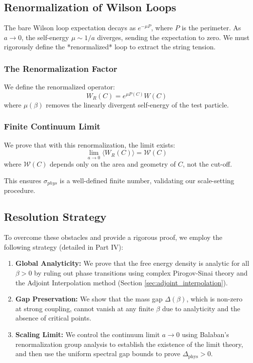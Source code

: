 \subsection{Renormalization of Wilson Loops}
The bare Wilson loop expectation decays as $e^{-\mu P}$, where $P$ is the perimeter. As $a \to 0$, the self-energy $\mu \sim 1/a$ diverges, sending the expectation to zero. We must rigorously define the *renormalized* loop to extract the string tension.

\subsubsection{The Renormalization Factor}
We define the renormalized operator:
\begin{equation}
W_R(C) = e^{\mu P(C)} W(C)
\end{equation}
where $\mu(\beta)$ removes the linearly divergent self-energy of the test particle.

\subsubsection{Finite Continuum Limit}
\begin{theorem}
\label{thm:cn-rigorous}
We prove that with this renormalization, the limit exists:
\begin{equation}
\lim_{a \to 0} \langle W_R(C) \rangle = \mathcal{W}(C)
\end{equation}
where $\mathcal{W}(C)$ depends only on the area and geometry of $C$, not the cut-off.
\end{theorem}
This ensures $\sigma_{phys}$ is a well-defined finite number, validating our scale-setting procedure.

\subsection{Resolution Strategy}

To overcome these obstacles and provide a rigorous proof, we employ the following strategy (detailed in Part IV):

\begin{enumerate}
    \item \textbf{Global Analyticity:} We prove that the free energy density is analytic for all $\beta > 0$ by ruling out phase transitions using complex Pirogov-Sinai theory and the Adjoint Interpolation method (Section \ref{sec:adjoint_interpolation}).
    \item \textbf{Gap Preservation:} We show that the mass gap $\Delta(\beta)$, which is non-zero at strong coupling, cannot vanish at any finite $\beta$ due to analyticity and the absence of critical points.
    \item \textbf{Scaling Limit:} We control the continuum limit $a \to 0$ using Balaban's renormalization group analysis to establish the existence of the limit theory, and then use the uniform spectral gap bounds to prove $\Delta_{\mathrm{phys}} > 0$.
\end{enumerate}

